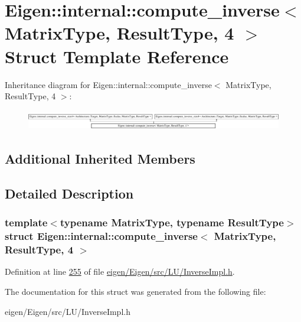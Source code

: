 \hypertarget{struct_eigen_1_1internal_1_1compute__inverse_3_01_matrix_type_00_01_result_type_00_014_01_4}{}\section{Eigen\+:\+:internal\+:\+:compute\+\_\+inverse$<$ Matrix\+Type, Result\+Type, 4 $>$ Struct Template Reference}
\label{struct_eigen_1_1internal_1_1compute__inverse_3_01_matrix_type_00_01_result_type_00_014_01_4}
Inheritance diagram for Eigen\+:\+:internal\+:\+:compute\+\_\+inverse$<$ Matrix\+Type, Result\+Type, 4 $>$\+:\begin{figure}[H]
\begin{center}
\leavevmode
\includegraphics[height=0.886076cm]{struct_eigen_1_1internal_1_1compute__inverse_3_01_matrix_type_00_01_result_type_00_014_01_4}
\end{center}
\end{figure}
\subsection*{Additional Inherited Members}


\subsection{Detailed Description}
\subsubsection*{template$<$typename Matrix\+Type, typename Result\+Type$>$\newline
struct Eigen\+::internal\+::compute\+\_\+inverse$<$ Matrix\+Type, Result\+Type, 4 $>$}



Definition at line \hyperlink{eigen_2_eigen_2src_2_l_u_2_inverse_impl_8h_source_l00255}{255} of file \hyperlink{eigen_2_eigen_2src_2_l_u_2_inverse_impl_8h_source}{eigen/\+Eigen/src/\+L\+U/\+Inverse\+Impl.\+h}.



The documentation for this struct was generated from the following file\+:\begin{DoxyCompactItemize}
\item 
eigen/\+Eigen/src/\+L\+U/\+Inverse\+Impl.\+h\end{DoxyCompactItemize}
